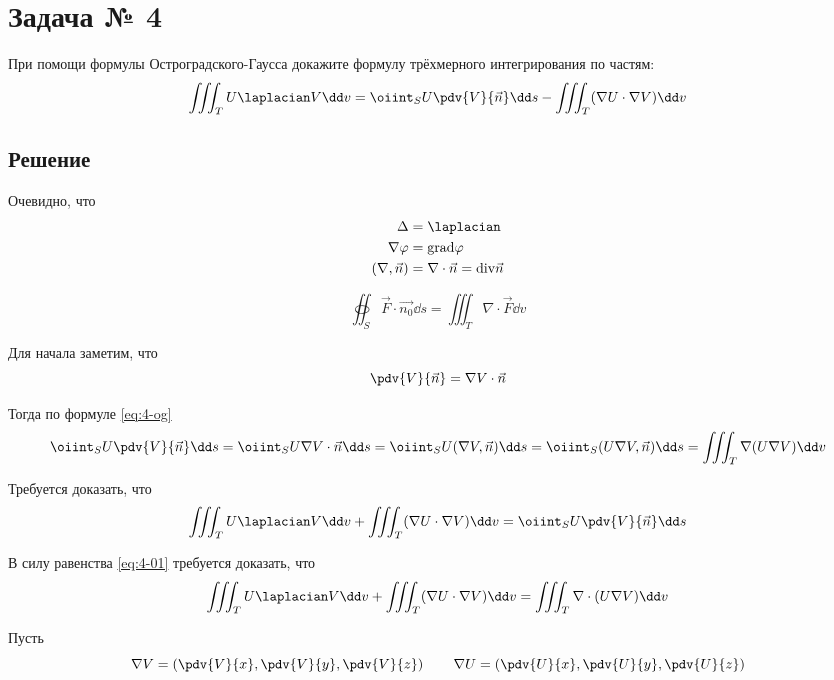 \section{Задача № 4}

При помощи формулы Остроградского-Гаусса докажите формулу трёхмерного
интегрирования по частям:
\[
  \iiint_{T} U \laplacian V \dd v
  = \oiint_{S} U \pdv{V}{\vec{n}} \dd s
  - \iiint_{T} (\nabla U \cdot \nabla V) \dd v
\]

\subsection{Решение}

Очевидно, что
\begin{align*}
  \Delta &= \laplacian \\
  \nabla \varphi &= \mathrm{grad} \varphi \\
  (\nabla, \vec{n}) &= \nabla \cdot \vec{n} = \mathrm{div} \vec{n}
\end{align*}

\begin{equation}\label{eq:4-og}
  \tag{Формула Гаусса-Остроградского}
  \oiint_{S} \vec{F} \cdot \vec{n_0} \dd s
  = \iiint_{T} \nabla \cdot \vec{F} \dd v
\end{equation}

Для начала заметим, что
\[
  \pdv{V}{\vec{n}} = \nabla V \cdot \vec{n}
\]

Тогда по формуле \ref{eq:4-og}
\begin{equation}\label{eq:4-01}
  \oiint_{S} U \pdv{V}{\vec{n}} \dd s
  = \oiint_{S} U \nabla V \cdot \vec{n} \dd s
  = \oiint_{S} U (\nabla V, \vec{n}) \dd s
  = \oiint_{S} (U \nabla V, \vec{n}) \dd s
  = \iiint_{T} \nabla (U \nabla V) \dd v
\end{equation}

Требуется доказать, что
\[
  \iiint_{T} U \laplacian V \dd v
  + \iiint_{T} (\nabla U \cdot \nabla V) \dd v
  = \oiint_{S} U \pdv{V}{\vec{n}} \dd s
\]

В силу равенства \ref{eq:4-01} требуется доказать, что
\[
  \iiint_{T} U \laplacian V \dd v
  + \iiint_{T} (\nabla U \cdot \nabla V) \dd v
  = \iiint_{T} \nabla \cdot (U \nabla V) \dd v
\]

Пусть
\[
  \nabla V
  = \left(\pdv{V}{x}, \pdv{V}{y}, \pdv{V}{z}\right) \qquad
  \nabla U
  = \left(\pdv{U}{x}, \pdv{U}{y}, \pdv{U}{z}\right)
\]

